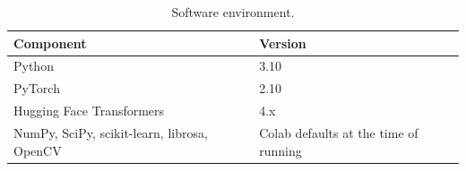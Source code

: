 \begin{table}[htbp]
\centering
\small
\caption{Software environment.}
\label{tab:software_environment}
\begin{tabular}{p{5cm} p{6cm}}
\hline
\textbf{Component} & \textbf{Version} \\
\hline
Python & 3.10 \\
PyTorch & 2.10 \\
Hugging Face Transformers & 4.x \\
NumPy, SciPy, scikit-learn, librosa, OpenCV & Colab defaults at the time of running \\
\hline
\end{tabular}
\end{table}
